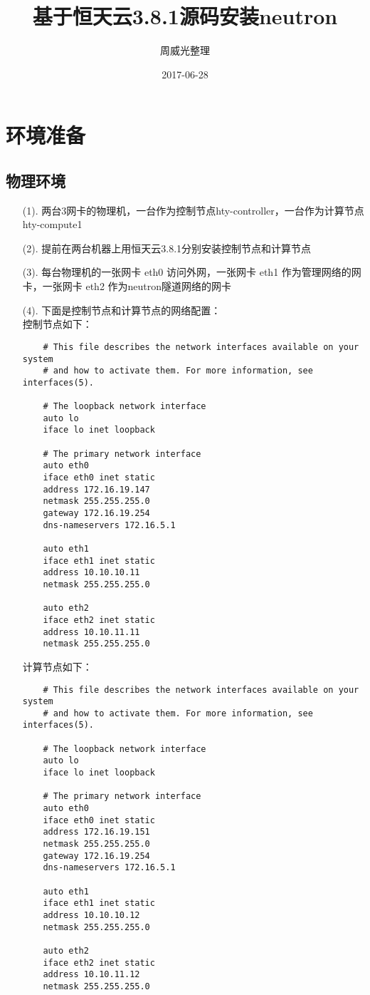 \documentclass[a4paper,left=1.5cm,right=1.5cm,11pt]{article}
\title{基于恒天云3.8.1源码安装neutron}
\author{周威光整理}
\date{2017-06-28}
\begin{document}
\maketitle
\clearpage
\tableofcontents
\clearpage
\section{环境准备}
\subsection{物理环境}
\begin{itemize}
	\item[(1).]两台3网卡的物理机，一台作为控制节点hty-controller，一台作为计算节点hty-compute1
	\item[(2).]提前在两台机器上用恒天云3.8.1分别安装控制节点和计算节点
	\item[(3).]每台物理机的一张网卡 eth0 访问外网，一张网卡 eth1 作为管理网络的网卡，一张网卡 eth2 作为neutron隧道网络的网卡
	\item[(4).]下面是控制节点和计算节点的网络配置：\\
	控制节点如下：
	\begin{lstlisting}
	# This file describes the network interfaces available on your system
	# and how to activate them. For more information, see interfaces(5).

	# The loopback network interface
	auto lo
	iface lo inet loopback

	# The primary network interface
	auto eth0
	iface eth0 inet static
	address 172.16.19.147
	netmask 255.255.255.0
	gateway 172.16.19.254
	dns-nameservers 172.16.5.1

	auto eth1
	iface eth1 inet static
	address 10.10.10.11
	netmask 255.255.255.0

	auto eth2
	iface eth2 inet static
	address 10.10.11.11
	netmask 255.255.255.0
	\end{lstlisting}
	计算节点如下：
	\begin{lstlisting}
	# This file describes the network interfaces available on your system
	# and how to activate them. For more information, see interfaces(5).

	# The loopback network interface
	auto lo
	iface lo inet loopback

	# The primary network interface
	auto eth0
	iface eth0 inet static
	address 172.16.19.151
	netmask 255.255.255.0
	gateway 172.16.19.254
	dns-nameservers 172.16.5.1

	auto eth1
	iface eth1 inet static
	address 10.10.10.12
	netmask 255.255.255.0

	auto eth2
	iface eth2 inet static
	address 10.10.11.12 
	netmask 255.255.255.0
	\end{lstlisting}
\end{itemize}
\end{document}
